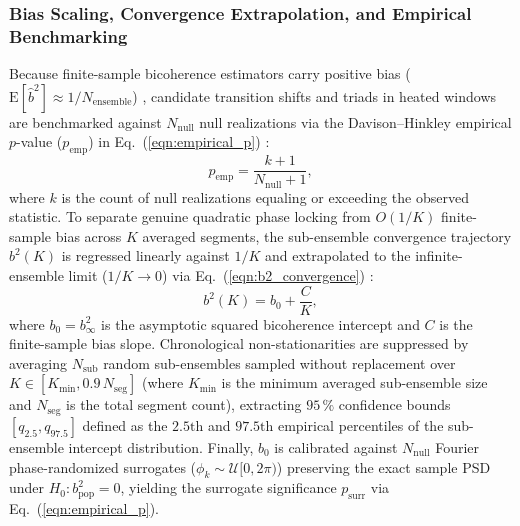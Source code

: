 \subsubsection{Bias Scaling, Convergence Extrapolation, and Empirical Benchmarking}
Because finite-sample bicoherence estimators carry positive bias ($\mathrm{E}[\hat{b}^2] \approx 1/N_{\mathrm{ensemble}}$) \cite{HinichWolinsky2005}, candidate transition shifts and triads in heated windows \cite{Kin2025, Miyashita2025} are benchmarked against $N_{\mathrm{null}}$ null realizations via the Davison--Hinkley empirical $p$-value ($p_{\mathrm{emp}}$) in Eq.~(\ref{eqn:empirical_p}) \cite{DavisonHinkley1997, james2021statistical}:
\begin{equation}
\label{eqn:empirical_p}
p_{\mathrm{emp}} = \frac{k + 1}{N_{\mathrm{null}} + 1},
\end{equation}
\noindent where $k$ is the count of null realizations equaling or exceeding the observed statistic. To separate genuine quadratic phase locking from $O(1/K)$ finite-sample bias across $K$ averaged segments, the sub-ensemble convergence trajectory $b^2(K)$ is regressed linearly against $1/K$ and extrapolated to the infinite-ensemble limit ($1/K \to 0$) via Eq.~(\ref{eqn:b2_convergence}) \cite{KimPowers1979, HinichWolinsky2005}:
\begin{equation}
\label{eqn:b2_convergence}
b^2(K) = b_0 + \frac{C}{K},
\end{equation}
\noindent where $b_0 = b^2_\infty$ is the asymptotic squared bicoherence intercept and $C$ is the finite-sample bias slope. Chronological non-stationarities are suppressed by averaging $N_{\mathrm{sub}}$ random sub-ensembles sampled without replacement over $K \in [K_{\mathrm{min}}, 0.9\,N_{\mathrm{seg}}]$ (where $K_{\mathrm{min}}$ is the minimum averaged sub-ensemble size and $N_{\mathrm{seg}}$ is the total segment count), extracting $95\,\%$ confidence bounds $[q_{2.5}, q_{97.5}]$ defined as the $2.5\text{th}$ and $97.5\text{th}$ empirical percentiles of the sub-ensemble intercept distribution. Finally, $b_0$ is calibrated against $N_{\mathrm{null}}$ Fourier phase-randomized surrogates ($\phi_k \sim \mathcal{U}[0, 2\pi)$) preserving the exact sample PSD under $H_0: b^2_{\mathrm{pop}} = 0$, yielding the surrogate significance $p_{\mathrm{surr}}$ via Eq.~(\ref{eqn:empirical_p}).